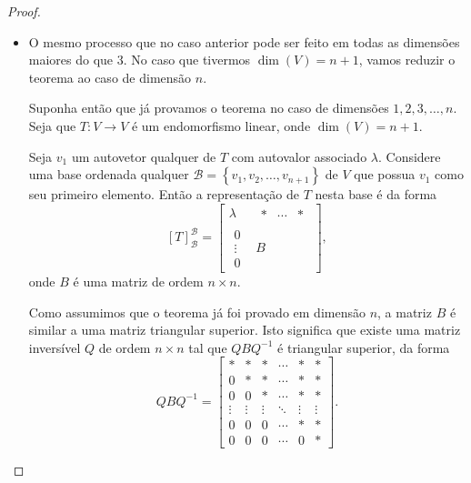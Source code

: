 \begin{proof}
\begin{itemize}
	\item O mesmo processo que no caso anterior pode ser feito em todas as dimensões maiores do que $3$. No caso que tivermos $\dim(V)=n+1$, vamos reduzir o teorema ao caso de dimensão $n$.
	
	Suponha então que já provamos o teorema no caso de dimensões $1,2,3,\ldots,n$. Seja que $T\colon V\to V$ é um endomorfismo linear, onde $\dim(V)=n+1$.
	
	Seja $v_1$ um autovetor qualquer de $T$ com autovalor associado $\lambda$. Considere uma base ordenada qualquer $\mathcal{B}=\left\{v_1,v_2,\ldots,v_{n+1}\right\}$ de $V$ que possua $v_1$ como seu primeiro elemento. Então a representação de $T$ nesta base é da forma
	\[[T]_{\mathcal{B}}^{\mathcal{B}}=\begin{bmatrix}\lambda&\begin{matrix}\ast&\cdots&\ast\end{matrix}\\\begin{matrix}0\\\vdots\\0\end{matrix}&B\end{bmatrix},\]
	onde $B$ é uma matriz de ordem $n\times n$.
	
	Como assumimos que o teorema já foi provado em dimensão $n$, a matriz $B$ é similar a uma matriz triangular superior. Isto significa que existe uma matriz inversível $Q$ de ordem $n\times n$ tal que $QBQ^{-1}$ é triangular superior, da forma
	\[QBQ^{-1}=\begin{bmatrix}\ast&\ast&\ast&\cdots&\ast&\ast\\0&\ast&\ast&\cdots&\ast&\ast\\0&0&\ast&\cdots&\ast&\ast\\	\vdots&\vdots&\vdots&\ddots&\vdots&\vdots\\
	0&0&0&\cdots&\ast&\ast\\0&0&0&\cdots&0&\ast\end{bmatrix}.\]
	

\end{itemize}
\end{proof}

